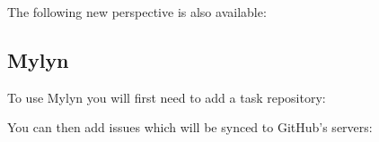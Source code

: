 \documentclass{beamer}
\begin{document}
\begin{frame}
  The following new perspective is also available:

\end{frame}

\subsection{Mylyn}
\begin{frame}
  To use Mylyn you will first need to add a task repository:

\end{frame}

\begin{frame}
  You can then add issues which will be synced to GitHub's servers:

\end{frame}
\end{document}
